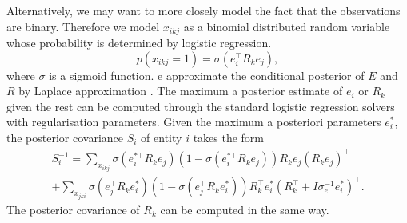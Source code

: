 Alternatively, we may want to more closely model the fact that the observations are binary.
Therefore we model $x_{ikj}$ as a binomial distributed random variable whose
probability is determined by logistic regression.
\[
p(x_{ikj}=1) = \sigma(e_i^{\top} R_k e_j),
\]
where $\sigma$ is a sigmoid function.
e approximate the conditional posterior of
$E$ and $R$ by Laplace approximation \cite{bishop2006pattern}. The maximum a
posterior estimate of $e_i$ or $R_k$ given the rest can be computed through the
standard logistic regression solvers with regularisation parameters. Given the
maximum a posteriori parameters $e_i^*$, the posterior covariance $S_i$ of entity
$i$ takes the form
\begin{align}
S_i^{-1} = \sum_{x_{ikj}} \sigma(e_{i}^{*\top} R_k e_{j}) (1 - \sigma(e_{i}^{*\top} R_k e_{j})) R_k
e_{j}(R_k e_{j})^\top \label{eqn:sample_e} \\
 + \sum_{x_{jki}} \sigma(e_{j}^{\top} R_k e_{i}^*) ( 1- \sigma(e_{j}^{\top} R_k e_{i}^*)) R_k^\top e^*_{i}(R_k^\top + I\sigma_e^{-1}
e^*_{i})^\top. \label{eqn:sample_r}
\end{align}
The posterior covariance of $R_k$ can be computed in the same way.
